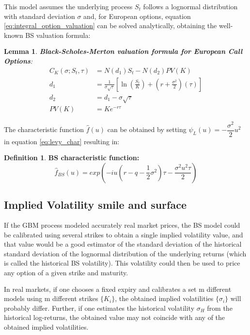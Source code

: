 \documentclass[12,twoside]{mammeTFM}
\newtheorem{lem}[thm]{Lemma}
\theoremstyle{definition}
\newtheorem{definition}[thm]{Definition}
\theoremstyle{remark}
\begin{document}
This model assumes the underlying process $S_t$ follows a lognormal distribution with standard deviation $\sigma$ and, for European options, equation \ref{eq:integral_option_valuation} can be solved analytically, obtaining the well-known BS valuation formula:

\begin{lem} \textbf{Black-Scholes-Merton valuation formula for European Call Options}:
\begin{align}
  C_K(\sigma; S_t, \tau) &= N(d_1)S_t - N(d_2) PV(K) \\
     d_1 &= \frac{1}{\sigma\sqrt{\tau}}\left[\ln\left(\frac{S_t}{K}\right) + \left(r + \frac{\sigma^2}{2}\right)(\tau)\right] \\
     d_2 &= d_1 - \sigma\sqrt{\tau} \\
PV(K) &=Ke^{-r\tau}
\end{align}
\end{lem}

The characteristic function $\hat{f}(u)$ can be obtained by setting $\psi_L (u) = -\dfrac{\sigma^2}{2}u^2$ in equation \ref{eq:levy_char} resulting in:
\begin{definition} \textbf{BS characteristic function:}
\begin{equation}
\hat{f}_{BS}(u) = exp{\left(-iu \left( r-q - \dfrac{1}{2}\sigma^2 \right) \tau - \dfrac{\sigma^2 u^2 \tau}{2} \right)}
\end{equation}
\end{definition}

\subsection{Implied Volatility smile and surface} \label{subsec:smile_and_surf}
If the GBM process modeled accurately real market prices, the BS model could be calibrated using several strikes to obtain a single implied volatility value, and that value would be a good estimator of the standard deviation of the historical standard deviation of the lognormal distribution of the underlying returns (which is called the historical BS volatility). This volatility could then be used to price any option of a given strike and maturity. 

In real markets, if one chooses a fixed expiry and calibrates a set  m different models using m different strikes $\{K_i\}$, the obtained implied volatilities $\{\sigma_i\}$ will probably differ. Further, if one estimates the historical volatility $\sigma_H$ from the historical log-returns, the obtained value may not coincide with any of the obtained implied volatilities.
\end{document}
